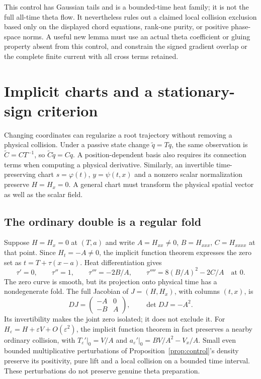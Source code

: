 \documentclass[11pt]{article}
\theoremstyle{definition}
\theoremstyle{remark}
\begin{document}
This control has Gaussian tails and is a bounded-time heat family; it is
not the full all-time theta flow. It nevertheless rules out a claimed
local collision exclusion based only on the displayed chord equations,
rank-one purity, or positive phase-space norms. A useful new lemma must
use an actual theta coefficient or gluing property absent from this
control, and constrain the signed gradient overlap or the complete finite
current with all cross terms retained.

\section{Implicit charts and a stationary-sign criterion}
\label{sec:implicit}

Changing coordinates can regularize a root trajectory without removing a
physical collision. Under a passive state change $\widetilde q=Tq$, the
same observation is $\widetilde C=CT^{-1}$, so
$\widetilde C\widetilde q=Cq$. A position-dependent basis also requires
its connection terms when computing a physical derivative. Similarly,
an invertible time-preserving chart $s=\varphi(t)$, $y=\psi(t,x)$ and
a nonzero scalar normalization preserve $H=H_x=0$. A general chart must
transform the physical spatial vector as well as the scalar field.

\subsection{The ordinary double is a regular fold}

Suppose $H=H_x=0$ at $(T,a)$ and write
$A=H_{xx}\ne0$, $B=H_{xxx}$, $C=H_{xxxx}$ at that point.
Since $H_t=-A\ne0$, the implicit function theorem expresses the zero
set as $t=T+\tau(x-a)$. Heat differentiation gives
\begin{equation}
 \tau'=0,\qquad \tau''=1,\qquad
 \tau'''=-2B/A,\qquad \tau''''=8(B/A)^2-2C/A
 \quad\text{at }0.
 \label{eq:fold-jets}
\end{equation}
The zero curve is smooth, but its projection onto physical time has a
nondegenerate fold. The full Jacobian of $J=(H,H_x)$, with columns
$(t,x)$, is
\begin{equation}
 DJ=\begin{pmatrix}-A&0\\-B&A\end{pmatrix},\qquad \det DJ=-A^2.
 \label{eq:joint-jacobian}
\end{equation}
Its invertibility makes the joint zero isolated; it does not exclude it.
For $H_\varepsilon=H+\varepsilon V+O(\varepsilon^2)$, the implicit
function theorem in fact preserves a nearby ordinary collision, with
$T_\varepsilon'|_0=V/A$ and
$a_\varepsilon'|_0=BV/A^2-V_x/A$. Small even bounded multiplicative
perturbations of Proposition~\ref{prop:control}'s density preserve its
positivity, pure lift and a local collision on a bounded time interval.
These perturbations do not preserve genuine theta preparation.
\end{document}
